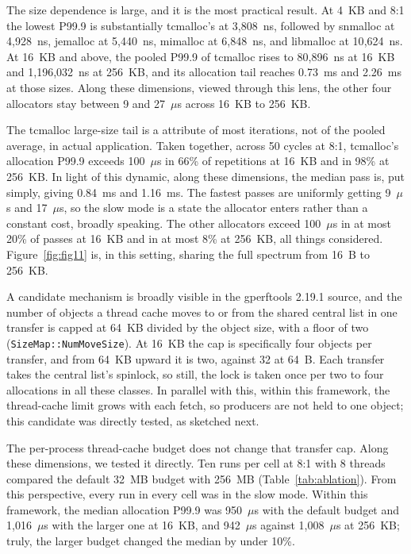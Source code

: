 The size dependence is large, and it is the most practical result. At 4~KB and 8:1 the lowest
P99.9 is substantially tcmalloc's at 3{,}808~ns, followed by snmalloc at 4{,}928~ns, jemalloc at 5{,}440~ns,
mimalloc at 6{,}848~ns, and libmalloc at 10{,}624~ns. At 16~KB and above, the pooled P99.9 of
tcmalloc rises to 80{,}896~ns at 16~KB and 1{,}196{,}032~ns at 256~KB, and its allocation tail reaches
0.73~ms and 2.26~ms at those sizes. Along these dimensions, viewed through this lens, the other four allocators stay between 9 and 27~$\mu$s across
16~KB to 256~KB.

The tcmalloc large-size tail is a attribute of most iterations, not of the pooled average, in actual application. Taken together, across 50
cycles at 8:1, tcmalloc's allocation P99.9 exceeds 100~$\mu$s in 66\% of repetitions at 16~KB and in
98\% at 256~KB. In light of this dynamic, along these dimensions, the median pass is, put simply, giving 0.84~ms and 1.16~ms. The fastest passes are uniformly getting 9~$\mu$s and
17~$\mu$s, so the slow mode is a state the allocator enters rather than a constant cost, broadly speaking. The other
allocators exceed 100~$\mu$s in at most 20\% of passes at 16~KB and in at most 8\% at 256~KB, all things considered.
Figure~\ref{fig:fig11} is, in this setting, sharing the full spectrum from 16~B to 256~KB.

A candidate mechanism is broadly visible in the gperftools 2.19.1 source, and the number of objects a thread cache moves
to or from the shared central list in one transfer is capped at 64~KB divided by the object size, with a floor
of two (\texttt{SizeMap::NumMoveSize}). At 16~KB the cap is specifically four objects per transfer, and from 64~KB upward it
is two, against 32 at 64~B. Each transfer takes the central list's spinlock, so still, the lock is taken once per two to
four allocations in all these classes. In parallel with this, within this framework, the thread-cache limit grows with each fetch, so producers are not held to one
object; this candidate was directly tested, as sketched next.

The per-process thread-cache budget does not change that transfer cap. Along these dimensions, we tested it directly. Ten runs per cell
at 8:1 with 8 threads compared the default 32~MB budget with 256~MB (Table~\ref{tab:ablation}). From this perspective, every run in every
cell was in the slow mode. Within this framework, the median allocation P99.9 was 950~$\mu$s with the default budget and 1{,}016~$\mu$s with
the larger one at 16~KB, and 942~$\mu$s against 1{,}008~$\mu$s at 256~KB; truly, the larger budget changed the median by
under 10\%.

